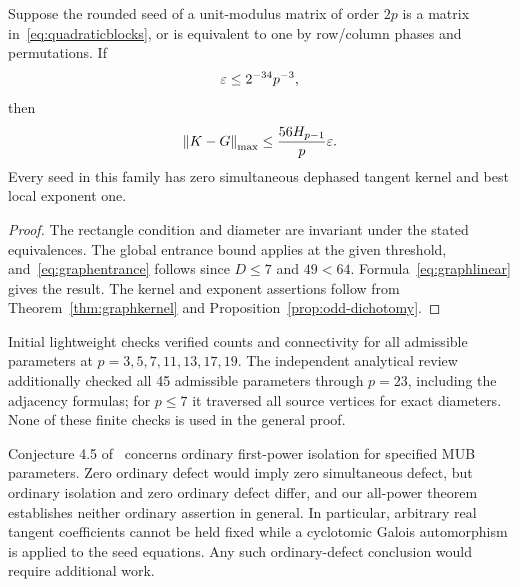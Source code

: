 \begin{corollary}\label{cor:quadraticlinear}
Suppose the rounded seed of a unit-modulus matrix of order $2p$ is a matrix in~\eqref{eq:quadraticblocks}, or is equivalent to one by row/column phases and permutations. If
\[
 \varepsilon\le2^{-34}p^{-3},
\]
then
\[
 \left\lVert K-G\right\rVert_{\mathrm{max}}\le\frac{56H_{p-1}}p\varepsilon.
\]
Every seed in this family has zero simultaneous dephased tangent kernel and best local exponent one.
\end{corollary}
\begin{proof}
The rectangle condition and diameter are invariant under the stated equivalences. The global entrance bound applies at the given threshold, and~\eqref{eq:graphentrance} follows since $D\le7$ and $49<64$. Formula~\eqref{eq:graphlinear} gives the result. The kernel and exponent assertions follow from Theorem~\ref{thm:graphkernel} and Proposition~\ref{prop:odd-dichotomy}.
\end{proof}
Initial lightweight checks verified counts and connectivity for all admissible parameters at $p=3,5,7,11,13,17,19$. The independent analytical review additionally checked all 45 admissible parameters through $p=23$, including the adjacency formulas; for $p\le7$ it traversed all source vertices for exact diameters. None of these finite checks is used in the general proof.

Conjecture 4.5 of~\cite{BOP} concerns ordinary first-power isolation for specified MUB parameters. Zero ordinary defect would imply zero simultaneous defect, but ordinary isolation and zero ordinary defect differ, and our all-power theorem establishes neither ordinary assertion in general. In particular, arbitrary real tangent coefficients cannot be held fixed while a cyclotomic Galois automorphism is applied to the seed equations. Any such ordinary-defect conclusion would require additional work.
